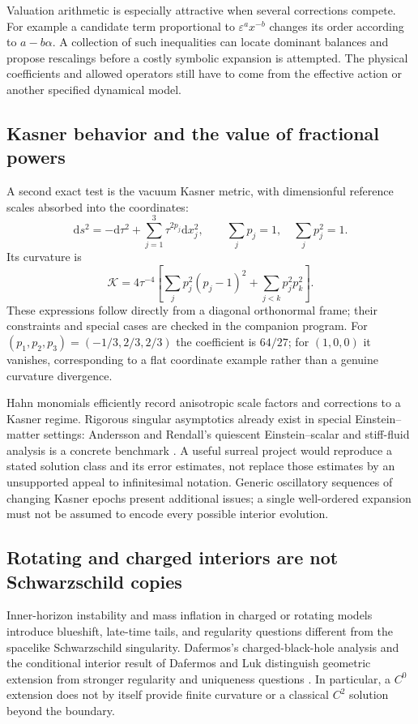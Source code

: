 \documentclass[11pt,a4paper]{article}
\numberwithin{equation}{section}
\theoremstyle{definition}
\theoremstyle{remark}
\newcommand{\Kret}{\mathcal K}
\newcommand{\dd}{\mathrm d}
\begin{document}
Valuation arithmetic is especially attractive when several corrections compete.
For example a candidate term proportional to
$\varepsilon^a x^{-b}$ changes its order according to $a-b\alpha$. A
collection of such inequalities can locate dominant balances and propose
rescalings before a costly symbolic expansion is attempted. The physical
coefficients and allowed operators still have to come from the effective
action or another specified dynamical model.

\subsection{Kasner behavior and the value of fractional powers}
A second exact test is the vacuum Kasner metric, with dimensionful reference
scales absorbed into the coordinates:
\begin{equation}\label{eq:kasner}
\dd s^2=-\dd\tau^2+\sum_{j=1}^3\tau^{2p_j}\dd x_j^2,
\qquad \sum_j p_j=1,\quad \sum_jp_j^2=1.
\end{equation}
Its curvature is
\begin{equation}\label{eq:kasnerK}
\Kret=4\tau^{-4}\left[
 \sum_j p_j^2(p_j-1)^2+\sum_{j<k}p_j^2p_k^2\right].
\end{equation}
These expressions follow directly from a diagonal orthonormal frame; their
constraints and special cases are checked in the companion program. For
$(p_1,p_2,p_3)=(-1/3,2/3,2/3)$ the coefficient is $64/27$; for
$(1,0,0)$ it vanishes, corresponding to a flat coordinate example rather than
a genuine curvature divergence.

Hahn monomials efficiently record anisotropic scale factors and corrections to
a Kasner regime. Rigorous singular asymptotics already exist in special
Einstein--matter settings: Andersson and Rendall's quiescent Einstein--scalar
and stiff-fluid analysis is a concrete benchmark \cite{AR}. A useful surreal
project would reproduce a stated solution class and its error estimates, not
replace those estimates by an unsupported appeal to infinitesimal notation.
Generic oscillatory sequences of changing Kasner epochs present additional
issues; a single well-ordered expansion must not be assumed to encode every
possible interior evolution.

\subsection{Rotating and charged interiors are not Schwarzschild copies}
Inner-horizon instability and mass inflation in charged or rotating models
introduce blueshift, late-time tails, and regularity questions different from
the spacelike Schwarzschild singularity. Dafermos's charged-black-hole analysis
and the conditional interior result of Dafermos and Luk distinguish geometric
extension from stronger regularity and uniqueness questions \cite{Dafermos,DL}.
In particular, a $C^0$ extension does not by itself provide finite curvature or
a classical $C^2$ solution beyond the boundary.
\end{document}
